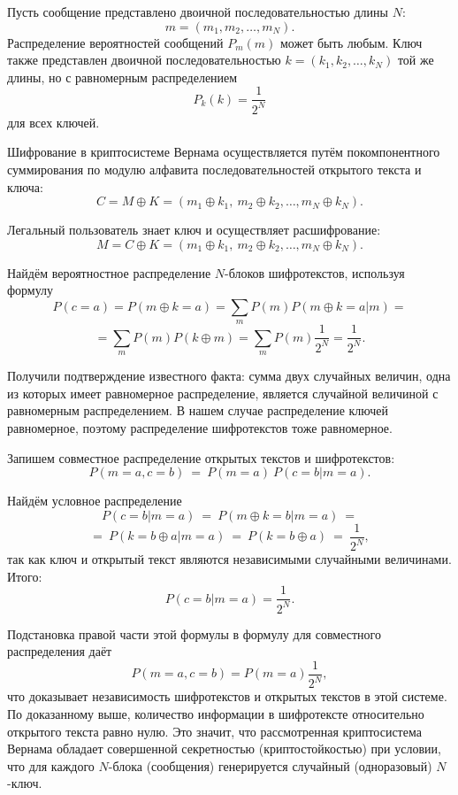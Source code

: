 Пусть сообщение представлено двоичной последовательностью длины $N$:
    \[ m = (m_1, m_2, \dots, m_N). \]
Распределение вероятностей сообщений $P_m(m)$ может быть любым. Ключ также представлен двоичной последовательностью $ k = (k_1, k_2, \dots, k_N)$ той же длины, но с равномерным распределением
    \[ P_k(k) = \frac{1}{2^N} \]
для всех ключей.

Шифрование в криптосистеме Вернама осуществляется путём покомпонентного суммирования по модулю алфавита последовательностей открытого текста и ключа:
    \[ C = M \oplus K = (m_1 \oplus k_1, ~ m_2 \oplus k_2, \dots, m_N \oplus k_N). \]

Легальный пользователь знает ключ и осуществляет расшифрование:
    \[ M =C \oplus K = (m_1 \oplus k_1, ~ m_2 \oplus k_2, \dots, m_N \oplus k_N). \]

Найдём вероятностное распределение $N$-блоков шифротекстов, используя формулу
    \[ P(c = a) = P(m \oplus k = a) = \sum_{m} P(m) P(m \oplus k = a | m) = \]
    \[ = \sum_{m} P(m) P(k \oplus m) = \sum_{m} P(m) \frac{1}{2^N} = \frac{1}{2^N}. \]

Получили подтверждение известного факта: сумма двух случайных величин, одна из которых имеет равномерное распределение, является случайной величиной с равномерным распределением. В нашем случае распределение ключей равномерное, поэтому распределение шифротекстов тоже равномерное.

Запишем совместное распределение открытых текстов и шифротекстов:
    \[ P(m = a, c = b) ~=~ P(m = a) ~ P(c = b | m = a). \]

Найдём условное распределение
    \[ P(c = b | m = a) ~=~ P(m \oplus k = b | m = a) ~= \]
    \[ =~ P(k = b \oplus a | m = a) ~=~ P(k = b \oplus a) ~=~ \frac{1}{2^N}, \]
так как ключ и открытый текст являются независимыми случайными величинами. Итого:
    \[ P(c=b | m=a) = \frac{1}{2^N}. \]

Подстановка правой части этой формулы в формулу для совместного распределения даёт
    \[ P(m=a,c=b)=P(m=a)\frac{1}{2^N}, \]
что доказывает независимость шифротекстов и открытых текстов в этой системе. По доказанному выше, количество информации в шифротексте относительно открытого текста равно нулю. Это значит, что рассмотренная криптосистема Вернама обладает совершенной секретностью (криптостойкостью) при условии, что для каждого $N$-блока (сообщения) генерируется случайный (одноразовый) $N$-ключ.



